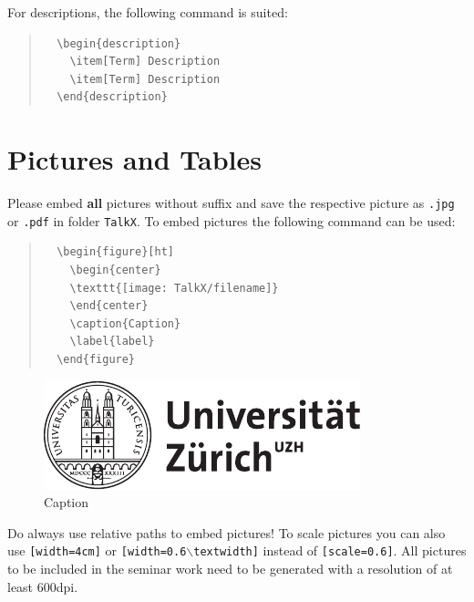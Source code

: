 For descriptions, the following command is suited:
\begin{quote}
  \begin{verbatim}
  \begin{description}
    \item[Term] Description
    \item[Term] Description
  \end{description}
  \end{verbatim}
\end{quote}


\section{Pictures and Tables}

Please embed \textbf{all} pictures without suffix and save the respective picture as \texttt{.jpg} or \texttt{.pdf} in folder \texttt{TalkX}. 
To embed pictures the following command can be used:
\begin{quote}
  \begin{verbatim}
  \begin{figure}[ht]
    \begin{center}
    \texttt{[image: TalkX/filename]}
    \end{center}
    \caption{Caption}
    \label{label}
  \end{figure}
  \end{verbatim}
\end{quote}

\begin{figure}[ht]
	\begin{center}
  \includegraphics[scale=0.6]{Example/uzh_logo_d}
  \end{center}
  \caption{Caption}
  \label{fig:label}
\end{figure}

Do always use relative paths to embed pictures!
To scale pictures you can also use \texttt{[width=4cm]} or
\texttt{[width=0.6$\backslash$textwidth]} instead of \texttt{[scale=0.6]}.
All pictures to be included in the seminar work need to be generated with a resolution of at least 600dpi.

